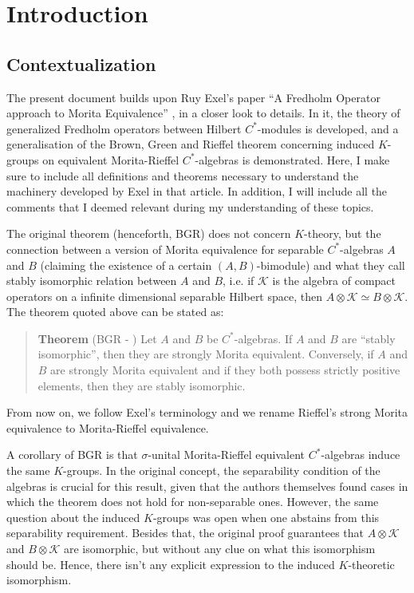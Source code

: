 \chapter*{Introduction}

\section*{Contextualization}

The present document builds upon Ruy Exel's paper ``A Fredholm Operator approach to Morita Equivalence'' \cite{exel7fredholm}, in a closer look to details. In it, the theory of generalized Fredholm operators between Hilbert $C^*$-modules is developed, and a generalisation of the Brown, Green and Rieffel theorem concerning induced $K$-groups on equivalent Morita-Rieffel $C^*$-algebras is demonstrated. Here, I make sure to include all definitions and theorems necessary to understand the machinery developed by Exel in that article. In addition, I will include all the comments that I deemed relevant during my understanding of these topics.

The original theorem (henceforth, BGR) does not concern $K$-theory, but the connection between a version of Morita equivalence for separable $C^*$-algebras $A$ and $B$ (claiming the existence of a certain $(A,B)$-bimodule) and what they call stably isomorphic relation between $A$ and $B$, i.e. if $\mathscr K$ is the algebra of compact operators on a infinite dimensional separable Hilbert space, then $A\otimes \mathscr K \simeq B\otimes \mathscr K$. The theorem quoted above can be stated as:
\begin{quote}
\textbf{Theorem} (BGR - \cite[Theorem 1.2]{brown1977morita}) 
Let $A$ and $B$ be $C^*$-algebras. If $A$ and $B$ are ``stably isomorphic'', then they are strongly Morita equivalent. Conversely, if $A$ and $B$ are strongly Morita equivalent and if they both possess strictly positive elements, then they are stably isomorphic.
\end{quote}

From now on, we follow Exel's terminology and we rename Rieffel's strong Morita equivalence to Morita-Rieffel equivalence.

A corollary of BGR is that $\sigma$-unital Morita-Rieffel equivalent $C^*$-algebras induce the same $K$-groups. In the original concept, the separability condition of the algebras is crucial for this result, given that the authors themselves found cases in which the theorem does not hold for non-separable ones. However, the same question about the induced $K$-groups was open when one abstains from this separability requirement. Besides that, the original proof guarantees that $A\otimes \mathscr K$ and $B \otimes \mathscr K$ are isomorphic, but without any clue on what this isomorphism should be. Hence, there isn't any explicit expression to the induced $K$-theoretic isomorphism.

